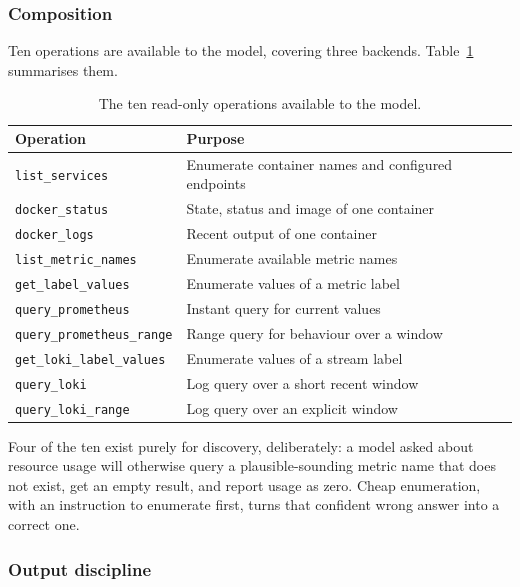 \documentclass[11pt,a4paper]{article}
\begin{document}
\subsubsection{Composition}

Ten operations are available to the model, covering three backends. Table~\ref{tab:tools}
summarises them.

\begin{table}[H]
\centering\small
\begin{tabularx}{\textwidth}{|l|X|}
\hline
\textbf{Operation} & \textbf{Purpose} \\
\hline
\texttt{list\_services} & Enumerate container names and configured endpoints \\
\hline
\texttt{docker\_status} & State, status and image of one container \\
\hline
\texttt{docker\_logs} & Recent output of one container \\
\hline
\texttt{list\_metric\_names} & Enumerate available metric names \\
\hline
\texttt{get\_label\_values} & Enumerate values of a metric label \\
\hline
\texttt{query\_prometheus} & Instant query for current values \\
\hline
\texttt{query\_prometheus\_range} & Range query for behaviour over a window \\
\hline
\texttt{get\_loki\_label\_values} & Enumerate values of a stream label \\
\hline
\texttt{query\_loki} & Log query over a short recent window \\
\hline
\texttt{query\_loki\_range} & Log query over an explicit window \\
\hline
\end{tabularx}
\caption{The ten read-only operations available to the model.}
\label{tab:tools}
\end{table}

Four of the ten exist purely for discovery, deliberately: a model asked about
resource usage will otherwise query a plausible-sounding metric name that does not
exist, get an empty result, and report usage as zero. Cheap enumeration, with an
instruction to enumerate first, turns that confident wrong answer into a correct one.

\subsubsection{Output discipline}
\end{document}
